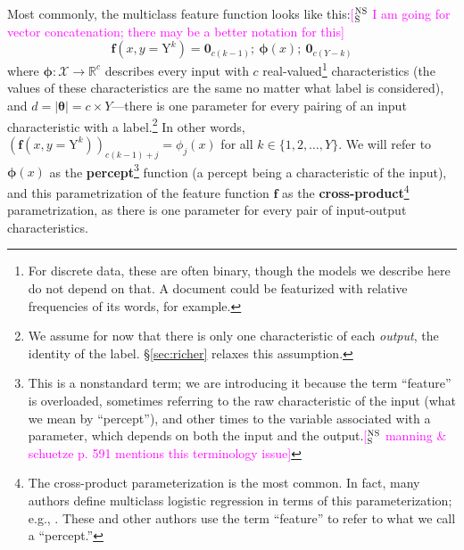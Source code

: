 \documentclass[11pt,letterpaper]{article}
\newcommand{\ensuretext}[1]{#1}
\newcommand{\nssmarker}{\ensuretext{\textcolor{magenta}{\ensuremath{^{\textsc{NS}}_{\textsc{S}}}}}}
\newcommand{\arkcomment}[3]{\ensuretext{\textcolor{#3}{[#1 #2]}}}
\newcommand{\nss}[1]{\arkcomment{\nssmarker}{#1}{magenta}}
\newcommand{\Sref}[1]{\S\ref{#1}}
\begin{document}
Most commonly, the multiclass feature function looks like this:\nss{I am going for vector concatenation; there may be a better notation for this}
\begin{equation}\label{eq:crossprod}
\mathbf{f}(x,y=\mathrm{Y}^k) = \mathbf{0}_{c(k-1)};\  \boldsymbol{\phi}(x);\  \mathbf{0}_{c(Y-k)}
\end{equation}
where $\boldsymbol{\phi}: \mathcal{X}\rightarrow\mathbb{R}^c$ describes every input with $c$ real-valued\footnote{For discrete data, these are often binary, though the models we describe here do not depend on that. A document could be featurized with relative frequencies of its words, for example.} 
characteristics (the values of these characteristics are the same no matter what label is considered), 
and $d = |\boldsymbol{\theta}| = c \times Y$---there is one parameter for every pairing of an input characteristic with a label.\footnote{We assume 
for now that there is only one characteristic of each {\em output}, the identity of the label. \Sref{sec:richer} relaxes this assumption.}
In other words, $\left(\mathbf{f}(x,y=\mathrm{Y}^k)\right)_{c(k-1)+j} = \phi_j(x)$ for all $k\in\{1,2,\ldots,Y\}$.
We will refer to $\boldsymbol{\phi}(x)$ as the {\bf percept}\footnote{This is a nonstandard term; we are introducing 
it because the term ``feature'' is overloaded, sometimes referring to the raw characteristic of the input (what we mean by ``percept''),
and other times to the variable associated with a parameter, 
which depends on both the input and the output.\nss{manning \& schuetze p. 591 mentions this terminology issue}} function (a percept being a characteristic of the input),
and this parametrization of the feature function $\mathbf{f}$ as the {\bf cross-product}\footnote{The cross-product parameterization is the most common. 
In fact, many authors define multiclass logistic regression in terms of this parameterization; e.g., \citet{hastie-09}. 
These and other authors use the term ``feature'' to refer to what we call a ``percept.''}
parametrization, as there is one parameter for every pair of input-output characteristics.
\end{document}
